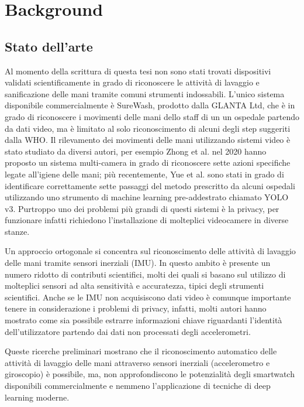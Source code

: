 \chapter{Background}
\label{cap:background}

\section{Stato dell'arte}
\label{sec:state-art}

Al momento della scrittura di questa tesi non sono stati trovati dispositivi validati scientificamente in grado di riconoscere le attività di lavaggio e sanificazione delle mani tramite comuni strumenti indossabili. L'unico sistema disponibile commercialmente è SureWash, prodotto dalla GLANTA Ltd, che è in grado di riconoscere i movimenti delle mani dello staff di un un ospedale partendo da dati video, ma è limitato al solo riconoscimento di alcuni degli step suggeriti dalla WHO.
Il rilevamento dei movimenti delle mani utilizzando sistemi video è stato studiato da diversi autori, per esempio Zhong et al. nel 2020 hanno proposto un sistema multi-camera in grado di riconoscere sette azioni specifiche legate all'igiene delle mani\cite{zhong2020multi}; più recentemente, Yue et al. sono stati in grado di identificare correttamente sette passaggi del metodo prescritto da alcuni ospedali utilizzando uno strumento di machine learning pre-addestrato chiamato YOLO v3\cite{yue2021intelligent}.
Purtroppo uno dei problemi più grandi di questi sistemi è la privacy, per funzionare infatti richiedono l'installazione di molteplici videocamere in diverse stanze.

Un approccio ortogonale si concentra sul riconoscimento delle attività di lavaggio delle mani tramite sensori inerziali (IMU). In questo ambito è presente un numero ridotto di contributi scientifici, molti dei quali si basano sul utilizzo di molteplici sensori ad alta sensitività e accuratezza, tipici degli strumenti scientifici\cite{galluzzi2015hand}\cite{bal2017system}\cite{li2018wristwash}. 
Anche se le IMU non acquisiscono dati video è comunque importante tenere in considerazione i problemi di privacy, infatti, molti autori hanno mostrato come sia possibile estrarre informazioni chiave riguardanti l'identità dell'utilizzatore partendo dai dati non processati degli accelerometri\cite{jain2018gender}\cite{van2019systematic}.

Queste ricerche preliminari mostrano che il riconoscimento automatico delle attività di lavaggio delle mani attraverso sensori inerziali (accelerometro e giroscopio) è possibile, ma, non approfondiscono le potenzialità degli smartwatch disponibili commercialmente e nemmeno l'applicazione di tecniche di deep learning moderne.

